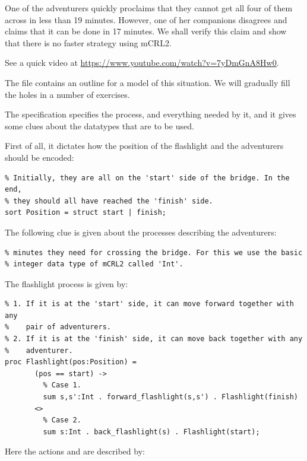 \documentclass[11pt]{article}
\theoremstyle{myplain}
\theoremstyle{definition} %
\begin{document}
One of the adventurers quickly proclaims that they cannot get all four of them across in less than 19 minutes. However, one of her companions disagrees and claims that it can be done in 17 minutes. We shall verify this claim and show that there is no faster strategy using mCRL2.

See a quick video at \textcolor{blue}{\url{https://www.youtube.com/watch?v=7yDmGnA8Hw0}}.

The file  contains an outline for a model of this situation. We will gradually fill the holes in a number of exercises.

The specification specifies the  process, and everything needed by it, and it gives some clues about the datatypes that are to be used.

First of all, it dictates how the position of the flashlight and the adventurers should be encoded:

\begin{lstlisting}[style=mcrl2]
% Data type for the position of adventurers and the flashlight.
% Initially, they are all on the 'start' side of the bridge. In the end,
% they should all have reached the 'finish' side.
sort Position = struct start | finish;
\end{lstlisting}

The following clue is given about the processes describing the adventurers:

\begin{lstlisting}[style=mcrl2]
% Adventurers are identified by their "speeds", i.e. the number of
% minutes they need for crossing the bridge. For this we use the basic
% integer data type of mCRL2 called 'Int'.
\end{lstlisting}

The flashlight process is given by:

\begin{lstlisting}[style=mcrl2]
% The Flashlight process models the flashlight:
% 1. If it is at the 'start' side, it can move forward together with any
%    pair of adventurers.
% 2. If it is at the 'finish' side, it can move back together with any
%    adventurer.
proc Flashlight(pos:Position) =
       (pos == start) ->
         % Case 1.
         sum s,s':Int . forward_flashlight(s,s') . Flashlight(finish)
       <> 
         % Case 2.
         sum s:Int . back_flashlight(s) . Flashlight(start);
\end{lstlisting}

Here the actions  and  are described by:
\end{document}
